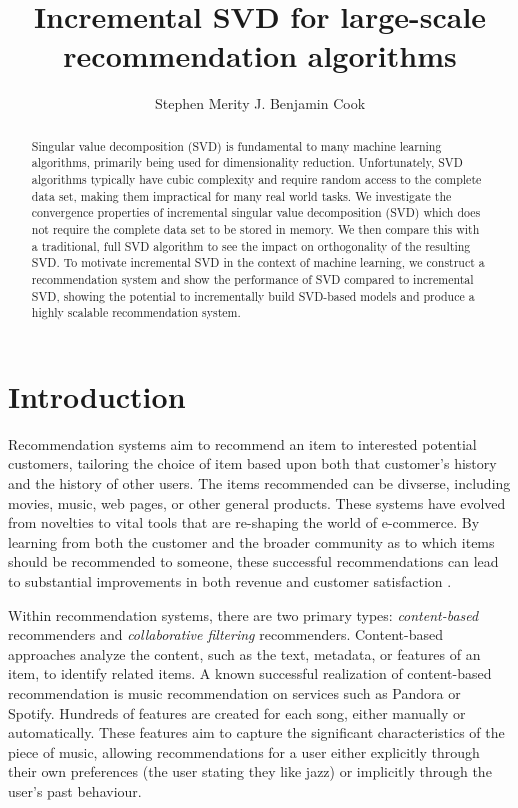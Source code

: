 \documentclass{article} %
\title{Incremental SVD for large-scale recommendation algorithms}
\author{
Stephen Merity
\And
J. Benjamin Cook
}
\begin{document}
\maketitle

\begin{abstract}
Singular value decomposition (SVD) is fundamental to many machine learning algorithms, primarily being used for dimensionality reduction.
Unfortunately, SVD algorithms typically have cubic complexity and require random access to the complete data set, making them impractical for many real world tasks.
We investigate the convergence properties of incremental singular value decomposition (SVD) which does not require the complete data set to be stored in memory.
We then compare this with a traditional, full SVD algorithm to see the impact on orthogonality of the resulting SVD.
To motivate incremental SVD in the context of machine learning, we construct a recommendation system and show the performance of SVD compared to incremental SVD, showing the potential to incrementally build SVD-based models and produce a highly scalable recommendation system.
\end{abstract}

\section{Introduction}

Recommendation systems aim to recommend an item to interested potential customers, tailoring the choice of item based upon both that customer's history and the history of other users.
The items recommended can be divserse, including movies, music, web pages, or other general products.
These systems have evolved from novelties to vital tools that are re-shaping the world of e-commerce.
By learning from both the customer and the broader community as to which items should be recommended to someone, these successful recommendations can lead to substantial improvements in both revenue and customer satisfaction \citep{schafer1999recommender}.

Within recommendation systems, there are two primary types: \textit{content-based} recommenders and \textit{collaborative filtering} recommenders.
Content-based approaches analyze the content, such as the text, metadata, or features of an item, to identify related items.
A known successful realization of content-based recommendation is music recommendation on services such as Pandora or Spotify.
Hundreds of features are created for each song, either manually or automatically.
These features aim to capture the significant characteristics of the piece of music, allowing recommendations for a user either explicitly through their own preferences (the user stating they like jazz) or implicitly through the user's past behaviour.
\end{document}
